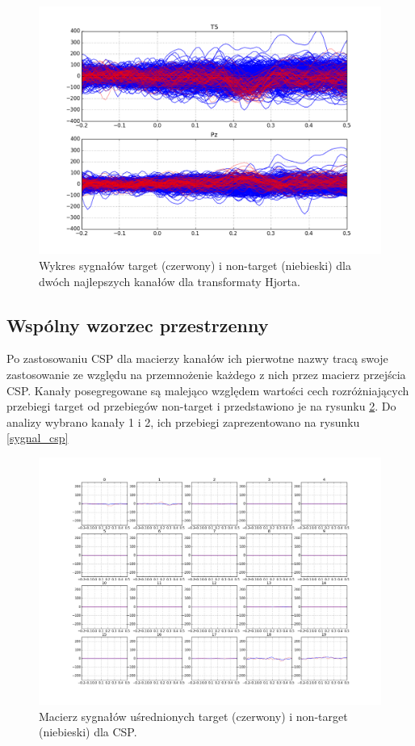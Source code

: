 \documentclass[licencjacka,openright]{pracamgr}
\begin{document}
\begin{figure}
\centering
\includegraphics[scale=0.55, trim=10mm 15mm 10mm 15mm, clip=True]{pics/sygnal_hjorth.png}
\caption{Wykres sygnałów target (czerwony) i non-target (niebieski) dla dwóch najlepszych kanałów dla transformaty Hjorta.}
\label{sygnal_hjorth}
\end{figure}

\subsection{Wspólny wzorzec przestrzenny}

Po zastosowaniu CSP dla macierzy kanałów ich pierwotne nazwy tracą swoje zastosowanie ze względu na przemnożenie każdego z nich przez macierz przejścia CSP. Kanały posegregowane są malejąco względem wartości cech rozróżniających przebiegi target od przebiegów non-target i przedstawiono je na rysunku \ref{macierz_csp}. Do analizy wybrano kanały 1 i 2, ich przebiegi zaprezentowano na rysunku \ref{sygnal_csp}

\begin{figure}
\centering
\includegraphics[scale=0.35, trim=10mm 25mm 10mm 25mm, clip=True]{pics/macierz_csp.png}
\caption{Macierz sygnałów uśrednionych target (czerwony) i non-target (niebieski) dla CSP.}
\label{macierz_csp}
\end{figure}
\end{document}
